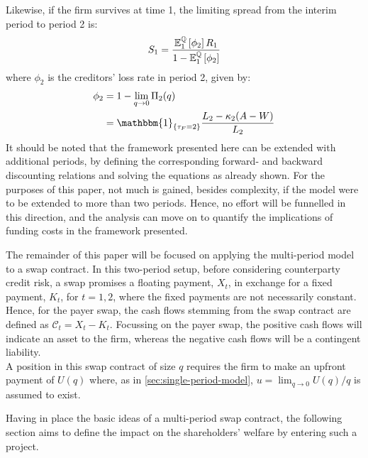 \documentclass[main.tex]{subfiles}
\begin{document}
        Likewise, if the firm survives at time 1, 
        the limiting spread from the interim period to period 2 is:
        \begin{equation*}
            S_1 =
            \frac{
                \mathbb{E}_{1}^{\mathbb{Q}}\left[\phi_2\right]R_1
            }{
                1 - \mathbb{E}_{1}^{\mathbb{Q}}\left[\phi_2\right] 
            }
        \end{equation*}
        where $\phi_{2}$ is the creditors' loss rate in period 2, given by:
        \begin{align*}
            \phi_2 
            &=
            1 - \lim_{q\rightarrow0} \Pi_{2}(q) 
            \nonumber \\
            &=
            \mathbbm{1}_{\{\tau_{F}=2\}}
            \frac{
                L_{2}-\kappa_{2}(A-W)
            }{
                L_{2}
            }
        \end{align*}
        It should be noted that the framework presented here can be extended 
        with additional periods, 
        by defining the corresponding forward- and backward discounting relations
        and solving the equations as already shown.
        For the purposes of this paper, not much is gained, besides complexity, 
        if the model were to be extended to more than two periods.
        Hence, no effort will be funnelled in this direction,
        and the analysis can move on to quantify the implications of funding costs
        in the framework presented.

        The remainder of this paper will be focused on applying the multi-period model 
        to a swap contract.
        In this two-period setup, before considering counterparty credit risk, a swap promises a floating payment, $X_t$, in exchange for a fixed payment, $K_t$, for $t = 1,2$, where the fixed payments are not necessarily constant.
        Hence, for the payer swap, the cash flows stemming from the swap contract are defined as $\mathcal{C}_t = X_t - K_t$.
        Focussing on the payer swap, the positive cash flows will indicate an asset to the firm, whereas the negative cash flows will be a contingent liability.
        \\
        A position in this swap contract of size $q$ requires the firm to make an upfront payment of $U(q)$ where, as in \cref{sec:single-period-model}, $u = \lim_{q \rightarrow 0} U(q)/q$ is assumed to exist.

        Having in place the basic ideas of a multi-period swap contract,
        the following section aims to define the impact on the shareholders' welfare by entering such a project.
\end{document}
